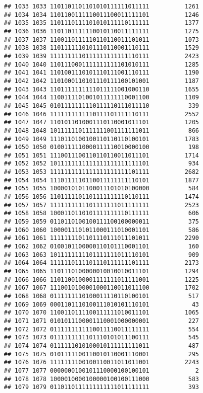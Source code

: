 \documentclass[]{article}
\begin{document}
\begin{verbatim}
## 1033 1033 1101101101101010111111011111          1261
## 1034 1034 1101100111110011100011111101          1246
## 1035 1035 1101110111101010111110111111          1377
## 1036 1036 1101101111110010110011111111          1275
## 1037 1037 1100110111110110110011101011          1073
## 1038 1038 1101111110101110110001110111          1529
## 1039 1039 1111111110111111111111110111          2423
## 1040 1040 1101110001111111111101010111          1285
## 1041 1041 1101001110101110111001110111          1190
## 1042 1042 1101000110101110111100101001          1187
## 1043 1043 1101111111111011111001000110          1655
## 1044 1044 1100111101001011111110001100          1109
## 1045 1045 0101111111110111110111011110           339
## 1046 1046 1111111111110111101111110111          2552
## 1047 1047 1101011010001110110001011101          1205
## 1048 1048 1011111101111111001111111011           866
## 1049 1049 1110110100100110110110100101          1783
## 1050 1050 0100111110000111110010000100           198
## 1051 1051 1110011100110110110011011101          1714
## 1052 1052 1011111111111111111111111101           934
## 1053 1053 1111111111111111111111101111          2682
## 1054 1054 1110111110110011111111110101          1877
## 1055 1055 1000010101100011101010100000           584
## 1056 1056 1101111101101111111110110111          1474
## 1057 1057 1111111111101111111011111111          2523
## 1058 1058 1000110110101111111110111111           606
## 1059 1059 0110110100100111100100000011           375
## 1060 1060 1000011101011000111010001101           586
## 1061 1061 1111111101101110111011101011          2290
## 1062 1062 0100101100000110101110001101           160
## 1063 1063 1011111111101111111011110101           909
## 1064 1064 1111110111101110111111101111          2173
## 1065 1065 1101110100000010010010011101          1294
## 1066 1066 1101100100001111111011111001          1225
## 1067 1067 1110010100001000110011011100          1702
## 1068 1068 0111111110100011110110100101           517
## 1069 1069 0001101110100111010101110101            43
## 1070 1070 1100110111100111111010011101          1065
## 1071 1071 0101011100001110001000000001           227
## 1072 1072 0111111111110011110011111111           554
## 1073 1073 0111111111101110101011100111           545
## 1074 1074 0111111010100010111111111011           487
## 1075 1075 0101111100110010110001110001           295
## 1076 1076 1111111100100110011011011001          2243
## 1077 1077 0000000100101110000100100101             2
## 1078 1078 1000010000100000100100111000           583
## 1079 1079 0110110111111111111011111111           393

\end{verbatim}
\end{document}

